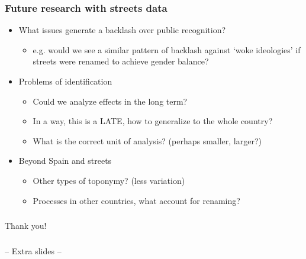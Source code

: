 \documentclass[aspectratio=43]{beamer}
\begin{document}
\begin{frame}
\frametitle{Future research with streets data}
\centering

\begin{itemize}
  \item<1-> What issues generate a backlash over public recognition?
  \begin{itemize}
    \item e.g. would we see a similar pattern of backlash against `woke ideologies' if streets were renamed to achieve gender balance?
  \end{itemize}
  \item<2-> Problems of identification
  \begin{itemize}
    \item Could we analyze effects in the long term?
    \item In a way, this is a LATE, how to generalize to the whole country?
    \item What is the correct unit of analysis? (perhaps smaller, larger?)
  \end{itemize}
  \item<3-> Beyond Spain and streets
  \begin{itemize}
    \item Other types of toponymy? (less variation)
    \item Processes in other countries, what account for renaming?
  \end{itemize}
\end{itemize}

\end{frame}

\begin{frame}
\frametitle{}
\centering

Thank you!

\end{frame}

\begin{frame}
\frametitle{}
\centering

-- Extra slides --

\end{frame}
\end{document}
